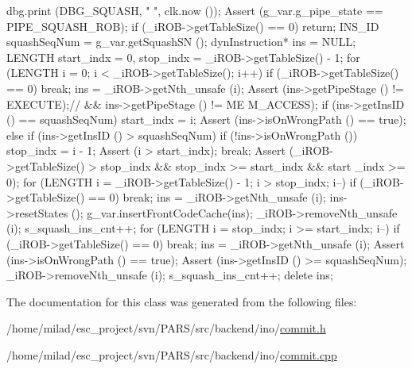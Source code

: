 \begin{DoxyCode}
                                  {
    dbg.print (DBG_SQUASH, "%
      ", clk.now ());
    Assert (g_var.g_pipe_state == PIPE_SQUASH_ROB);
    if (_iROB->getTableSize() == 0) return;
    INS_ID squashSeqNum = g_var.getSquashSN ();
    dynInstruction* ins = NULL;
    LENGTH start_indx = 0, stop_indx = _iROB->getTableSize() - 1;
    for (LENGTH i = 0; i < _iROB->getTableSize(); i++) {
        if (_iROB->getTableSize() == 0) break;
        ins = _iROB->getNth_unsafe (i);
        Assert (ins->getPipeStage () != EXECUTE);// && ins->getPipeStage () != ME
      M_ACCESS);
        if (ins->getInsID () == squashSeqNum) {
            start_indx = i;
            Assert (ins->isOnWrongPath () == true);
        } else if (ins->getInsID () > squashSeqNum) {
            if (!ins->isOnWrongPath ()) {
                stop_indx = i - 1;
                Assert (i > start_indx);
                break;
            }
        }
    }
    Assert (_iROB->getTableSize() > stop_indx && stop_indx >= start_indx && start
      _indx >= 0);
    for (LENGTH i = _iROB->getTableSize() - 1; i > stop_indx; i--) {
        if (_iROB->getTableSize() == 0) break;
        ins = _iROB->getNth_unsafe (i);
        ins->resetStates ();
        g_var.insertFrontCodeCache(ins);
        _iROB->removeNth_unsafe (i);
        s_squash_ins_cnt++;
    }
    for (LENGTH i = stop_indx; i >= start_indx; i--) {
        if (_iROB->getTableSize() == 0) break;
        ins = _iROB->getNth_unsafe (i);
        Assert (ins->isOnWrongPath () == true);
        Assert (ins->getInsID () >= squashSeqNum);
        _iROB->removeNth_unsafe (i);
        s_squash_ins_cnt++;
        delete ins;
    }
}
\end{DoxyCode}


The documentation for this class was generated from the following files:\begin{DoxyCompactItemize}
\item 
/home/milad/esc\_\-project/svn/PARS/src/backend/ino/\hyperlink{ino_2commit_8h}{commit.h}\item 
/home/milad/esc\_\-project/svn/PARS/src/backend/ino/\hyperlink{ino_2commit_8cpp}{commit.cpp}\end{DoxyCompactItemize}
